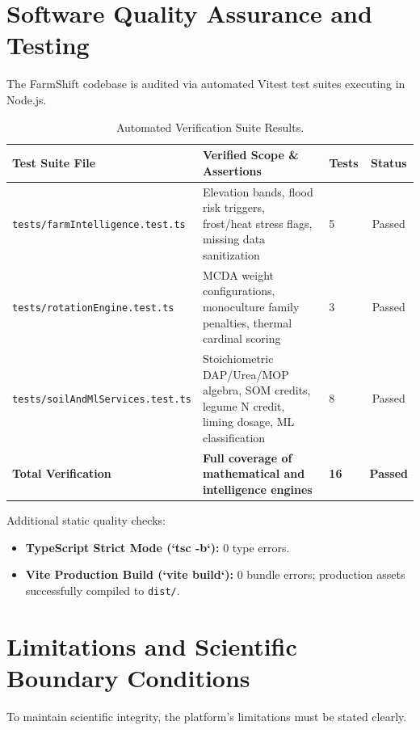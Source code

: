 \documentclass[11pt,a4paper]{report}
\begin{document}
\chapter{Software Quality Assurance and Testing}

The FarmShift codebase is audited via automated Vitest test suites executing in Node.js.

\begin{table}[htbp]
\centering
\small
\caption{Automated Verification Suite Results.}
\label{tab:tests}
\begin{tabularx}{\textwidth}{lXlc}
\toprule
\textbf{Test Suite File} & \textbf{Verified Scope \& Assertions} & \textbf{Tests} & \textbf{Status} \\
\midrule
\texttt{tests/farmIntelligence.test.ts} & Elevation bands, flood risk triggers, frost/heat stress flags, missing data sanitization & 5 & Passed \\
\texttt{tests/rotationEngine.test.ts} & MCDA weight configurations, monoculture family penalties, thermal cardinal scoring & 3 & Passed \\
\texttt{tests/soilAndMlServices.test.ts} & Stoichiometric DAP/Urea/MOP algebra, SOM credits, legume N credit, liming dosage, ML classification & 8 & Passed \\
\midrule
\textbf{Total Verification} & \textbf{Full coverage of mathematical and intelligence engines} & \textbf{16} & \textbf{Passed} \\
\bottomrule
\end{tabularx}
\end{table}

Additional static quality checks:
\begin{itemize}
  \item \textbf{TypeScript Strict Mode (`tsc -b`):} 0 type errors.
  \item \textbf{Vite Production Build (`vite build`):} 0 bundle errors; production assets successfully compiled to \texttt{dist/}.
\end{itemize}

\chapter{Limitations and Scientific Boundary Conditions}

To maintain scientific integrity, the platform's limitations must be stated clearly.
\end{document}
